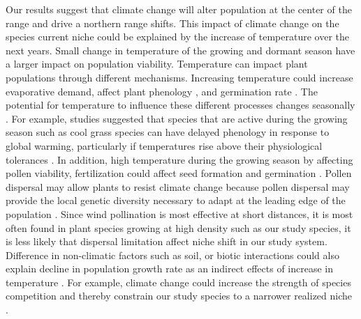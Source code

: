 \documentclass[12pt]{article}\usepackage[]{graphicx}\usepackage[dvipsnames]{xcolor}
\begin{document}
Our results suggest that climate change will alter population at the center of the range and drive a northern range shifts. 
This impact of climate change on the species current niche could be explained by the increase of temperature over the next years.
Small change in temperature of the growing and dormant season have a larger impact on population viability.
Temperature can impact plant populations through different mechanisms.
Increasing temperature could increase evaporative demand, affect plant phenology \citep{mclean2016predicting,sherry2007divergence,iler2019reproductive}, and germination rate \citep{reed2021climate}.
The potential for temperature to influence these different processes changes seasonally \citep{konapala2020climate}.
For example, studies suggested that species that are active during the growing season such as cool grass species can have delayed phenology in response to global warming, particularly if temperatures rise above their physiological tolerances \citep{cleland2007shifting, williams2015life}.
In addition, high temperature during the growing season by affecting pollen viability, fertilization could affect seed formation and germination \citep{hatfield2015temperature,sletvold2015climate}.
Pollen dispersal may allow plants to resist climate change because pollen dispersal may provide the local genetic diversity necessary to adapt at the leading edge of the population \citep{kremer2012long,corlett2013will,duputie2012genetic}.
Since wind pollination is most effective at short distances, it is most often found in plant species growing at high density such as our study species, it is less likely that dispersal limitation  affect niche shift in our study system.
Difference in non-climatic factors such as soil, or biotic interactions could also explain decline in population growth rate as an indirect effects of increase in temperature \citep{alexander2015novel,schultz2022climate}.
For example, climate change could increase the strength of species competition and thereby constrain our study species  to a narrower realized niche \citep{pulliam2000relationship,aguilee2016pollen}.
\end{document}
